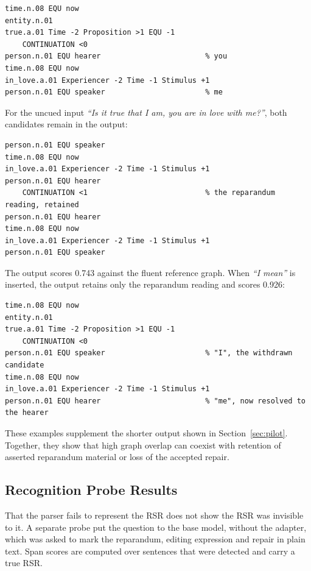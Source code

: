 \documentclass{article}
\begin{document}
\begin{lstlisting}[style=sbn]
time.n.08 EQU now
entity.n.01
true.a.01 Time -2 Proposition >1 EQU -1
    CONTINUATION <0
person.n.01 EQU hearer                        % you
time.n.08 EQU now
in_love.a.01 Experiencer -2 Time -1 Stimulus +1
person.n.01 EQU speaker                       % me
\end{lstlisting}

For the uncued input \textit{``Is it true that I am, you are in love with
me?''}, both candidates remain in the output:

\begin{lstlisting}[style=sbn]
% ... as above, up to the CONTINUATION
person.n.01 EQU speaker
time.n.08 EQU now
in_love.a.01 Experiencer -2 Time -1 Stimulus +1
person.n.01 EQU hearer
    CONTINUATION <1                           % the reparandum reading, retained
person.n.01 EQU hearer
time.n.08 EQU now
in_love.a.01 Experiencer -2 Time -1 Stimulus +1
person.n.01 EQU speaker
\end{lstlisting}

The output scores 0.743 against the fluent reference graph. When
\textit{``I mean''} is inserted, the output retains only the reparandum reading
and scores 0.926:

\begin{lstlisting}[style=sbn]
time.n.08 EQU now
entity.n.01
true.a.01 Time -2 Proposition >1 EQU -1
    CONTINUATION <0
person.n.01 EQU speaker                       % "I", the withdrawn candidate
time.n.08 EQU now
in_love.a.01 Experiencer -2 Time -1 Stimulus +1
person.n.01 EQU hearer                        % "me", now resolved to the hearer
\end{lstlisting}

These examples supplement the shorter output shown in
Section~\ref{sec:pilot}. Together, they show that high graph overlap can
coexist with retention of asserted reparandum material or loss of the accepted
repair.

\subsection{Recognition Probe Results}

That the parser fails to represent the RSR does not show the RSR was
invisible to it. A separate probe put the question to the base model, without
the adapter, which was asked to mark the reparandum, editing expression and repair in
plain text. Span scores are computed over sentences that were detected and
carry a true RSR.
\end{document}
